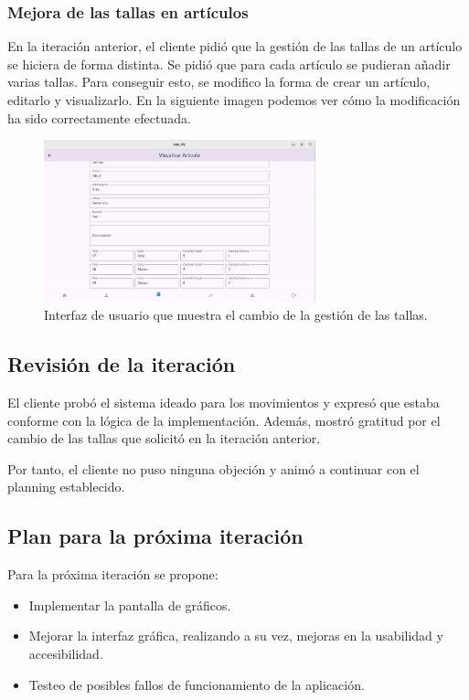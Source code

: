 \subsubsection{Mejora de las tallas en artículos}

En la iteración anterior, el cliente pidió que la gestión de las tallas de un artículo se hiciera de forma distinta. Se pidió que para cada artículo se pudieran añadir varias tallas. Para conseguir esto, se modifico la forma de crear un artículo, editarlo y visualizarlo. En la siguiente imagen podemos ver cómo la modificación ha sido correctamente efectuada. 

\begin{figure}[H]
	\centering
	\includegraphics[width=0.7\textwidth]{imagenes/SegundaIteracion/tallasMultiples.png}
	\caption{Interfaz de usuario que muestra el cambio de la gestión de las tallas.}
	\label{fig:appPantallaDetallesDevolucion}
\end{figure}

\subsection{Revisión de la iteración}

El cliente probó el sistema ideado para los movimientos y expresó que estaba conforme con la lógica de la implementación. Además, mostró gratitud por el cambio de las tallas que solicitó en la iteración anterior. 

Por tanto, el cliente no puso ninguna objeción y animó a continuar con el planning establecido. 

\subsection{Plan para la próxima iteración}

Para la próxima iteración se propone: 

\begin{itemize}
	\item Implementar la pantalla de gráficos.
	\item Mejorar la interfaz gráfica, realizando a su vez, mejoras en la usabilidad y accesibilidad.
	\item Testeo de posibles fallos de funcionamiento de la aplicación.
\end{itemize}

